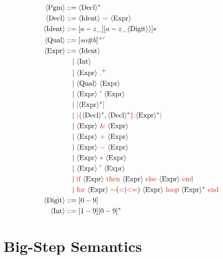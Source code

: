 \documentclass[letterpaper,12pt]{article}
\begin{document}
\newcommand{\nt}[1]{\textcolor{syntax_color}{#1}}
\newcommand{\ntext}[1]{\textcolor{syntax_color}{\text{#1}}}
\newcommand{\term}[1]{\langle \text{#1} \rangle}
\begin{align*}
    \term{Pgm} &::= \langle \text{Decl} \rangle^* \\
    \langle \text{Decl} \rangle &::= \term{Ident} \ \ntext{=} \ \langle \text{Expr} \rangle \\
    \term{Ident} &::= [a-z\_][a-z\_\term{Digit} \rangle]* \\
    \term{Qual} &::= [so\#b]^+\textcolor{syntax_color}{'} \\
    \term{Expr} &::= \langle \text{Ident} \rangle \\
    &\quad | \ \langle \text{Int} \rangle \\
    &\quad | \ \term{Expr} \ \textcolor{syntax_color}{.}^+ \\
    &\quad | \ \term{Qual} \ \term{Expr} \\
    &\quad | \ \term{Expr} \ \nt{'} \ \term{Expr} \\
    &\quad | \ \nt{[} \term{Expr}^* \nt{]} \\
    &\quad | \ \nt{|} \nt{\lbrace} \term{Decl}^*, \term{Decl}^* \nt{\rbrace} \nt{:} \term{Expr}^* \nt{|} \\
    &\quad | \ \term{Expr} \ \nt{\&} \ \term{Expr} \\
    &\quad | \ \term{Expr} \ \nt{+} \ \term{Expr} \\
    &\quad | \ \term{Expr} \ \nt{-} \ \term{Expr} \\
    &\quad | \ \term{Expr} \ \nt{*} \ \term{Expr} \\
    &\quad | \ \term{Expr} \ \nt{'} \ \term{Expr} \\
    &\quad | \ \ntext{\text{if}}\  \term{Expr} \ \ntext{then}\ \term{Expr} \ \ntext{else}\ \term{Expr} \ \ntext{end} \\
    &\quad | \ \textcolor{syntax_color}{\text{for}}\  \term{Expr} \ \textcolor{syntax_color}{\sim}{(\nt{<}|\nt{<=})}\ \term{Expr} \ \textcolor{syntax_color}{\text{loop}}\ \term{Expr}^* \ \ntext{end} \\
   \term{Digit} &::= {[0-9]} \\
    \term{Int} &::= {[1-9][0-9]^*}
\end{align*}


\section{Big-Step Semantics}
\end{document}
